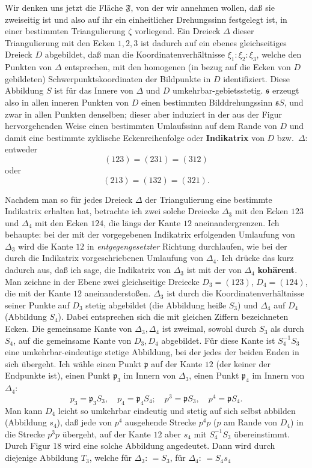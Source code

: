 \documentclass{article}
\begin{document}
Wir denken uns jetzt die Fläche $\mathfrak{F}$, von der wir annehmen wollen, daß sie zweiseitig ist und also auf ihr ein einheitlicher Drehungssinn festgelegt ist, in einer bestimmten Triangulierung $\zeta$ vorliegend. Ein Dreieck $\Delta$ dieser Triangulierung mit den Ecken $1, 2, 3$ ist dadurch auf ein ebenes gleichseitiges Dreieck $D$ abgebildet, daß man die Koordinatenverhältnisse $\xi_1\colon \xi_2\colon \xi_3$, welche den Punkten von $\Delta$ entsprechen, mit den homogenen (in bezug auf die Ecken von $D$ gebildeten) Schwerpunktskoordinaten der Bildpunkte in $D$ identifiziert. Diese Abbildung $S$ ist für das Innere von $\Delta$ und $D$ umkehrbar-gebietsstetig. $\mathfrak{s}$ erzeugt also in allen inneren Punkten von $D$ einen bestimmten Bilddrehungssinn $\mathfrak{s} S$, und zwar in allen Punkten denselben; dieser aber induziert in der aus der Figur hervorgehenden Weise einen bestimmten Umlaufssinn auf dem Rande von $D$ und damit eine bestimmte zyklische Eckenreihenfolge oder \textbf{Indikatrix} von $D$ bzw.\ $\Delta$: entweder
\[ (123) = (231) = (312) \]
oder
\[ (213) = (132) = (321). \]


Nachdem man so für jedes Dreieck $\Delta$ der Triangulierung eine bestimmte Indikatrix erhalten hat, betrachte ich zwei solche Dreiecke $\Delta_3$ mit den Ecken $123$ und $\Delta_4$ mit den Ecken $124$, die längs der Kante $12$ aneinandergrenzen. Ich behaupte: bei der mit der vorgegebenen Indikatrix erfolgenden Umlaufung von $\Delta_3$ wird die Kante $12$ in \emph{entgegengesetzter} Richtung durchlaufen, wie bei der durch die Indikatrix vorgeschriebenen Umlaufung von $\Delta_4$. Ich drücke das kurz dadurch aus, daß ich sage, die Indikatrix von $\Delta_3$ ist mit der von $\Delta_4$ \textbf{kohärent}. Man zeichne in der Ebene zwei gleichseitige Dreiecke $D_3 = (123)$, $D_4 = (124)$, die mit der Kante $12$ aneinanderstoßen. $\Delta_3$ ist durch die Koordinatenverhältnisse seiner Punkte auf $D_3$ stetig abgebildet (die Abbildung heiße $S_3$) und $\Delta_4$ auf $D_4$ (Abbildung $S_4$). Dabei entsprechen sich die mit gleichen Ziffern bezeichneten Ecken. Die gemeinsame Kante von $\Delta_3, \Delta_4$ ist zweimal, sowohl durch $S_3$ als durch $S_4$, auf die gemeinsame Kante von $D_3, D_4$ abgebildet. Für diese Kante ist $S_4^{-1} S_3$ eine umkehrbar-eindeutige stetige Abbildung, bei der jedes der beiden Enden in sich übergeht. Ich wähle einen Punkt $\mathfrak{p}$ auf der Kante $12$ (der keiner der Endpunkte ist), einen Punkt $\mathfrak{p}_3$ im Innern von $\Delta_3$, einen Punkt $\mathfrak{p}_4$ im Innern von $\Delta_4$:
\[ p_3 = \mathfrak{p}_3 S_3, \quad p_4 = \mathfrak{p}_4 S_4; \quad p^3 = \mathfrak{p} S_3, \quad p^4 = \mathfrak{p} S_4. \]
Man kann $D_4$ leicht so umkehrbar eindeutig und stetig auf sich selbst abbilden (Abbildung $s_4$), daß jede von $p^4$ ausgehende Strecke $p^4 p$ ($p$ am Rande von $D_4$) in die Strecke $p^3 p$ übergeht, auf der Kante $12$ aber $s_4$ mit $S_4^{-1} S_3$ übereinstimmt. Durch Figur 18 wird eine solche Abbildung angedeutet. Dann wird durch diejenige Abbildung $T_3$, welche für $\Delta_3$: $= S_3$, für $\Delta_4$: $= S_4 s_4$
\end{document}
